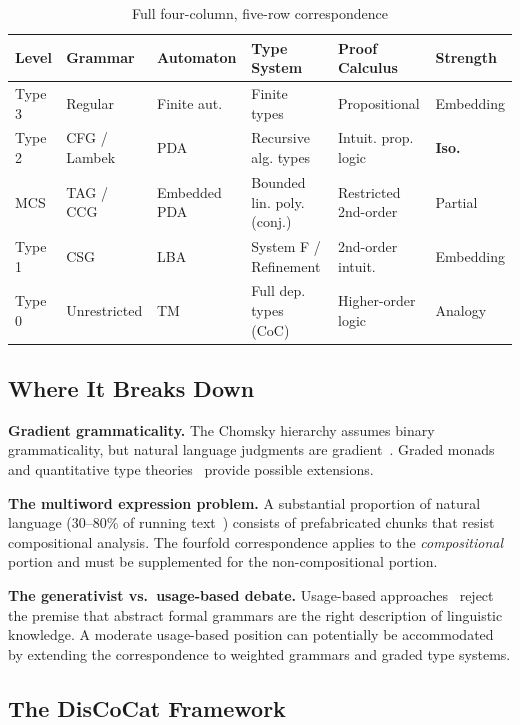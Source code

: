 \documentclass[12pt,a4paper]{article}
\begin{document}
\begin{table}[ht]
\centering
\caption{Full four-column, five-row correspondence}
\label{tab:consolidated}
\small
\begin{tabular}{@{}llllll@{}}
\toprule
Level & Grammar & Automaton & Type System & Proof Calculus & Strength \\
\midrule
Type 3 & Regular & Finite aut. & Finite types & Propositional & Embedding \\
Type 2 & CFG / Lambek & PDA & Recursive alg. types & Intuit. prop. logic & \textbf{Iso.} \\
MCS & TAG / CCG & Embedded PDA & Bounded lin. poly. (conj.) & Restricted 2nd-order & Partial \\
Type 1 & CSG & LBA & System F / Refinement & 2nd-order intuit. & Embedding \\
Type 0 & Unrestricted & TM & Full dep. types (CoC) & Higher-order logic & Analogy \\
\bottomrule
\end{tabular}
\end{table}

\subsection{Where It Breaks Down}
\label{sec:limitations}

\textbf{Gradient grammaticality.} The Chomsky hierarchy assumes binary
grammaticality, but natural language judgments are
gradient~\cite{LauClarkLappin2017,SprouseSchutzeAlmeida2013}. Graded monads
and quantitative type theories~\cite{Atkey2018,McBride2016} provide possible
extensions.

\textbf{The multiword expression problem.} A substantial proportion of natural
language (30--80\% of running text~\cite{ErmanWarren2000,Wray2002}) consists
of prefabricated chunks that resist compositional analysis. The fourfold
correspondence applies to the \emph{compositional} portion and must be
supplemented for the non-compositional portion.

\textbf{The generativist vs.\ usage-based debate.} Usage-based
approaches~\cite{Goldberg1995,Langacker1987,Bybee2006} reject the premise
that abstract formal grammars are the right description of linguistic
knowledge. A moderate usage-based position can potentially be accommodated by
extending the correspondence to weighted grammars and graded type systems.

\subsection{The DisCoCat Framework}
\end{document}
